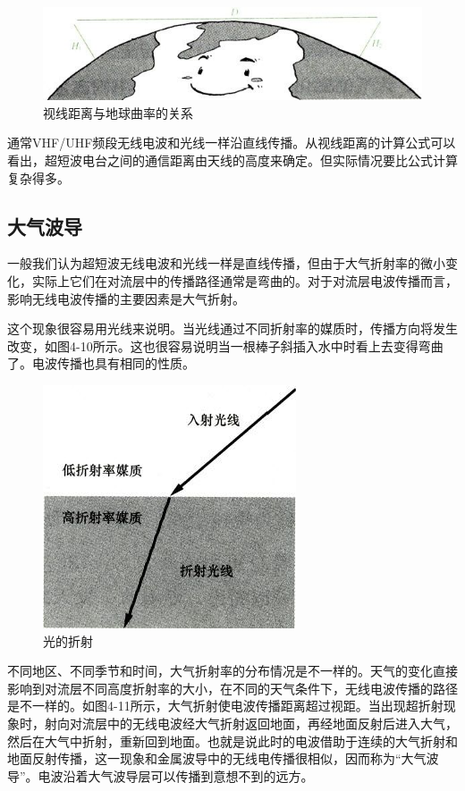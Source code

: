 \documentclass[12pt,UTF8]{ctexbook}
\begin{document}
\begin{figure}[htbp]
	\centering
	\includegraphics[width=0.7\linewidth]{52}
	\caption{视线距离与地球曲率的关系}
	\label{fig:1}
\end{figure}

通常VHF/UHF频段无线电波和光线一样沿直线传播。从视线距离的计算公式可以看出，超短波电台之间的通信距离由天线的高度来确定。但实际情况要比公式计算复杂得多。

\subsection{大气波导}

一般我们认为超短波无线电波和光线一样是直线传播，但由于大气折射率的微小变化，实际上它们在对流层中的传播路径通常是弯曲的。对于对流层电波传播而言，影响无线电波传播的主要因素是大气折射。

这个现象很容易用光线来说明。当光线通过不同折射率的媒质时，传播方向将发生改变，如图4-10所示。这也很容易说明当一根棒子斜插入水中时看上去变得弯曲了。电波传播也具有相同的性质。

\begin{figure}[htbp]
	\centering
	\includegraphics[width=0.7\linewidth]{53}
	\caption{光的折射}
	\label{fig:1}
\end{figure}

不同地区、不同季节和时间，大气折射率的分布情况是不一样的。天气的变化直接影响到对流层不同高度折射率的大小，在不同的天气条件下，无线电波传播的路径是不一样的。如图4-11所示，大气折射使电波传播距离超过视距。当出现超折射现象时，射向对流层中的无线电波经大气折射返回地面，再经地面反射后进入大气，然后在大气中折射，重新回到地面。也就是说此时的电波借助于连续的大气折射和地面反射传播，这一现象和金属波导中的无线电传播很相似，因而称为“大气波导”。电波沿着大气波导层可以传播到意想不到的远方。
\end{document}
